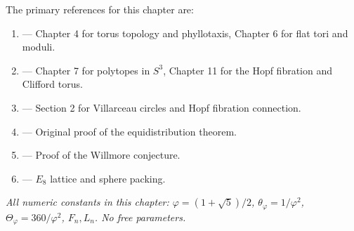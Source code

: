 \noindent The primary references for this chapter are:

\begin{enumerate}
\item {} --- Chapter 4 for torus topology and phyllotaxis,
  Chapter 6 for flat tori and moduli.
\item {} --- Chapter 7 for polytopes in $S^3$,
  Chapter 11 for the Hopf fibration and Clifford torus.
\item {} --- Section 2 for Villarceau circles
  and Hopf fibration connection.
\item {} --- Original proof of the equidistribution theorem.
\item {} --- Proof of the Willmore conjecture.
\item {} --- $E_8$ lattice and sphere packing.
\end{enumerate}

\vspace{1em}
\noindent\emph{All numeric constants in this chapter: $\varphi = (1+\sqrt{5})/2$,
$\theta_\varphi = 1/\varphi^2$, $\Theta_\varphi = 360/\varphi^2$, $F_n, L_n$.
No free parameters.}
